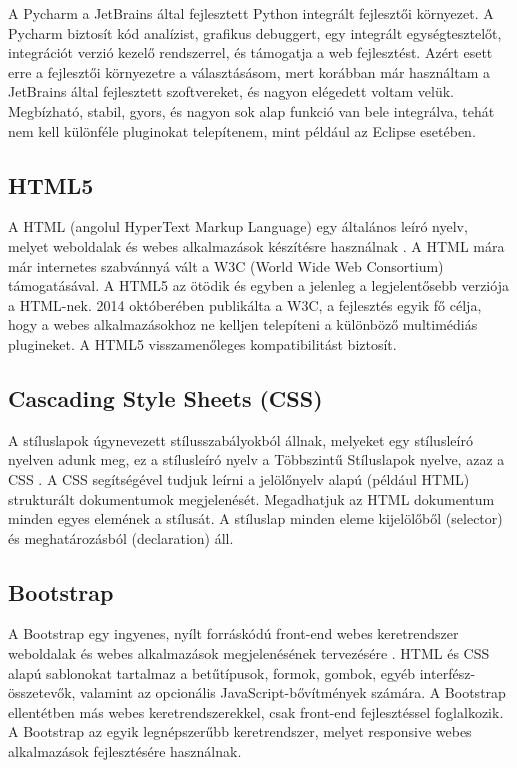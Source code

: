 A Pycharm a JetBrains által fejlesztett Python integrált fejlesztői környezet. A Pycharm biztosít kód analízist, grafikus debuggert, egy integrált egységtesztelőt, integrációt verzió kezelő rendszerrel, és támogatja a web fejlesztést.
Azért esett erre a fejlesztői környezetre a választásásom, mert korábban már használtam a JetBrains által fejlesztett szoftvereket, és nagyon elégedett voltam velük. Megbízható, stabil, gyors, és nagyon sok alap funkció van bele integrálva, tehát nem kell különféle pluginokat telepítenem, mint például az Eclipse esetében.

\subsection{HTML5}

A HTML (angolul HyperText Markup Language) egy általános leíró nyelv, melyet weboldalak és webes alkalmazások készítésre használnak \cite{html}. A HTML mára már internetes szabvánnyá vált a W3C (World Wide Web Consortium) támogatásával.
A HTML5 az ötödik és egyben a jelenleg a legjelentősebb verziója a HTML-nek. 2014 októberében publikálta a W3C, a fejlesztés egyik fő célja, hogy a webes alkalmazásokhoz ne kelljen telepíteni a különböző multimédiás plugineket. A HTML5 visszamenőleges kompatibilitást biztosít.

\subsection{Cascading Style Sheets (CSS)}

A stíluslapok úgynevezett stílusszabályokból állnak, melyeket egy stílusleíró nyelven adunk meg, ez a stílusleíró nyelv a Többszintű Stíluslapok nyelve, azaz a CSS \cite{css}. A CSS segítségével tudjuk leírni a jelölőnyelv alapú (például HTML) strukturált dokumentumok megjelenését. Megadhatjuk az HTML dokumentum minden egyes elemének a stílusát. A stíluslap minden eleme kijelölőből (selector) és meghatározásból (declaration) áll.

\subsection{Bootstrap}

A Bootstrap egy ingyenes, nyílt forráskódú front-end webes keretrendszer weboldalak és webes alkalmazások megjelenésének tervezésére \cite{bootstrap}. HTML és CSS alapú sablonokat tartalmaz a betűtípusok, formok, gombok, egyéb interfész-összetevők, valamint az opcionális JavaScript-bővítmények számára. A Bootstrap ellentétben más webes keretrendszerekkel, csak front-end fejlesztéssel foglalkozik. A Bootstrap az egyik legnépszerűbb keretrendszer, melyet responsive webes alkalmazások fejlesztésére használnak.

